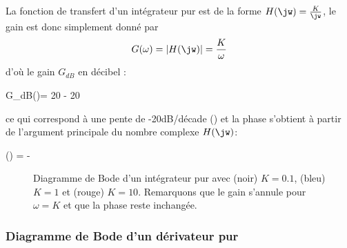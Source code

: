 La fonction de transfert d'un intégrateur pur est de la forme 
$H(\jw)=\frac{K}{\jw}$, le gain est donc simplement donné par 
$$
G(\omega)=|H(\jw)|=\frac{K}{\omega}
$$ 
d'où le gain $G_{dB}$ en décibel :
\begin{bequation}
G_{dB}(\omega)= 20 - 20\log{\omega}
\end{bequation} ce qui correspond à une pente de -20dB/décade 
() et la phase s'obtient à partir de l'argument principale 
du nombre complexe $H(\jw)$:
\begin{bequation}
\phi(\omega) = -
\end{bequation}
\begin{figure}[!htb]
    \centering
    

    
    \caption{Diagramme de Bode d'un intégrateur pur avec (noir) 
             $K=0.1$, (bleu) $K=1$ et (rouge) $K=10$. Remarquons 
             que le gain s'annule pour $\omega=K$ et que la phase reste 
             inchangée.\label{fig-bode_int}}
\end{figure}
\subsubsection{Diagramme de Bode d'un dérivateur pur}

